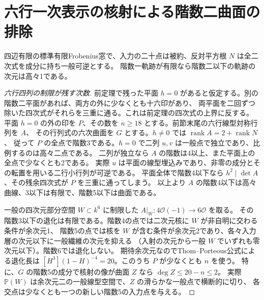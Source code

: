\section{六行一次表示の核射による階数二曲面の排除}
\label{sec:low-rank-surface-exclusion}
\begin{theorem}\label{thm:low-rank-surface-exclusion}
四辺有限の標準有限Frobenius窓で、入力の二十点は被約、反対平方根 $N$ は全二次式を成分に持ち一般可逆とする。
階数一軌跡が有限なら階数二以下の軌跡の次元は高々1である。
\end{theorem}
\begin{proof}[六行四列の制限が残す次数]
前定理で残った平面 $h=0$ があると仮定する。別の階数二平面があれば、両方の外に少なくとも十六印があり、
両平面を二回ずつ除いた四次式がそれらを三重に通る。これは前定理の四次式の上界に反する。
平面 $h=0$ の外の印を $P$、その数を $n\ge18$ とする。前節末尾の六行線型対称行列を $A$、
その行列式の六次曲面を $G$ とする。$h\ne0$ では $\operatorname{rank} A=2+\operatorname{rank} N$、
従って $P$ の全点で階数3である。$h=0$ で二列 $u,v$ は一般点で独立であり、比例するのは高々二点である。
二列が独立なら $A$ の階数は4以上、また平面上の全点で少なくとも2である。
実際 $u$ は平面の線型埋込みであり、非零の成分とその転置を用いる二行小行列が可逆である。
平面全体で階数4以下なら $h^2\mid\det A$、その残余四次式が $P$ を三重に通ってしまう。
以上より $A$ の階数4以下は高々曲線、3以下は有限で、階数5以下は曲面である。

一般の四次元部分空間 $W\subset k^6$ に制限した $A|_W:4\mathcal O(-1)\to6\mathcal O$ を取る。
その階数3以下の退化は有限である。階数4の点では二次元核に $W$ が非自明に交わる条件が余次元1、
階数5の点では核を $W$ が含む条件が余次元2であり、各々入力層の次元以下に一般繊維の次元を抑える
（入射の次元から一般 $W$ でいずれも零次元以下）。階数6では退化しない。
期待余次元なのでThom--Porteous公式による退化長は
$[H^3](1-H)^{-4}=20$。このうち $P$ が少なくとも $n$ を使う。
特に、$G$ の階数5の成分で核射の像が曲面 $Z$ なら $\deg Z\le20-n\le2$。
実際 $\mathbb P(W)$ は余次元二の一般線型空間で、$Z$ の滑らかな一般点で横断的に切り、
各交点は少なくとも一つの新しい階数5の入力点を与える。
\end{proof}
